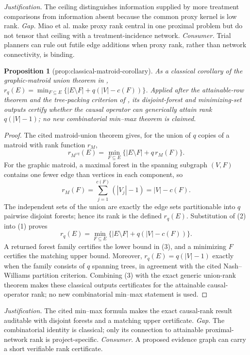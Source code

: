 \documentclass{article}
\newtheorem{proposition}{Proposition}
\begin{document}
\par\smallskip\noindent \textit{Justification.} The ceiling distinguishes information supplied by more treatment comparisons from information absent because the common proxy kernel is low rank. \textit{Gap.} Miao et al. make proxy rank central in one proximal problem but do not tensor that ceiling with a treatment-incidence network. \textit{Consumer.} Trial planners can rule out futile edge additions when proxy rank, rather than network connectivity, is binding.

\begin{proposition}[prop:classical-matroid-corollary]\label{prop:classical-matroid-corollary}
As a classical corollary of the graphic-matroid union theorem in \cite{Edmonds1965}, \(r_q(E)=\min_{F\subseteq E}\{|E\setminus F|+q(|V|-c(F))\}\). Applied after the attainable-row theorem and the tree-packing criterion of \cite{NashWilliams1961}, its disjoint-forest and minimizing-set outputs certify whether the causal operator can generically attain rank \(q(|V|-1)\); no new combinatorial min--max theorem is claimed.
\end{proposition}
\begin{proof}
The cited matroid-union theorem gives, for the union of \(q\) copies of a matroid with rank function \(r_M\),
\[
r_{M^{\vee q}}(E)=\min_{F\subseteq E}
\{|E\setminus F|+q\,r_M(F)\}.
\tag{1}
\]
For the graphic matroid, a maximal forest in the spanning subgraph \((V,F)\) contains one fewer edge than vertices in each component, so
\[
r_M(F)=\sum_{j=1}^{c(F)}(|V_j|-1)=|V|-c(F).
\tag{2}
\]
The independent sets of the union are exactly the edge sets partitionable into \(q\) pairwise disjoint forests; hence its rank is the defined \(r_q(E)\).  Substitution of (2) into (1) proves
\[
r_q(E)=\min_{F\subseteq E}
\{|E\setminus F|+q(|V|-c(F))\}.
\tag{3}
\]
A returned forest family certifies the lower bound in (3), and a minimizing \(F\) certifies the matching upper bound.  Moreover, \(r_q(E)=q(|V|-1)\) exactly when the family consists of \(q\) spanning trees, in agreement with the cited Nash--Williams partition criterion.  Combining (3) with the exact generic union-rank theorem makes these classical outputs certificates for the attainable causal-operator rank; no new combinatorial min--max statement is used.
\end{proof}
\par\smallskip\noindent \textit{Justification.} The cited min--max formula makes the exact causal-rank result auditable with disjoint forests and a matching upper certificate. \textit{Gap.} The combinatorial identity is classical; only its connection to attainable proximal-network rank is project-specific. \textit{Consumer.} A proposed evidence graph can carry a short verifiable rank certificate.
\end{document}
